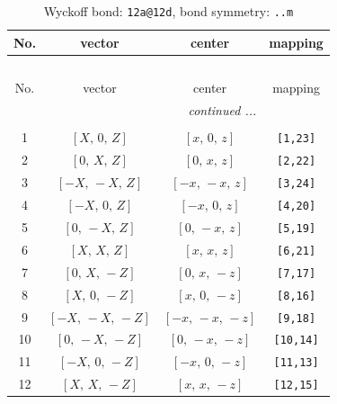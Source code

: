 \documentclass[fleqn,8pt]{jsarticle}
\begin{document}
\begin{longtable}{cccc}
\caption{Wyckoff bond: {\tt 12a@12d}, bond symmetry: {\tt ..m}}
 \\
 \hline \hline
No. & vector & center & mapping \\ \hline \endfirsthead

\multicolumn{3}{l}{\tablename\ \thetable{}} \\
 \hline \hline
No. & vector & center & mapping \\ \hline \endhead

 \hline \hline
\multicolumn{3}{r}{\footnotesize\it continued ...} \\ \endfoot

 \hline \hline
\multicolumn{3}{r}{} \\ \endlastfoot

1 & $\left[ X,\, 0,\, Z \right]$ & $\left[ x,\, 0,\, z \right]$ & {\tt [1,23]} \\ \hline
2 & $\left[ 0,\, X,\, Z \right]$ & $\left[ 0,\, x,\, z \right]$ & {\tt [2,22]} \\ \hline
3 & $\left[ - X,\, - X,\, Z \right]$ & $\left[ - x,\, - x,\, z \right]$ & {\tt [3,24]} \\ \hline
4 & $\left[ - X,\, 0,\, Z \right]$ & $\left[ - x,\, 0,\, z \right]$ & {\tt [4,20]} \\ \hline
5 & $\left[ 0,\, - X,\, Z \right]$ & $\left[ 0,\, - x,\, z \right]$ & {\tt [5,19]} \\ \hline
6 & $\left[ X,\, X,\, Z \right]$ & $\left[ x,\, x,\, z \right]$ & {\tt [6,21]} \\ \hline
7 & $\left[ 0,\, X,\, - Z \right]$ & $\left[ 0,\, x,\, - z \right]$ & {\tt [7,17]} \\ \hline
8 & $\left[ X,\, 0,\, - Z \right]$ & $\left[ x,\, 0,\, - z \right]$ & {\tt [8,16]} \\ \hline
9 & $\left[ - X,\, - X,\, - Z \right]$ & $\left[ - x,\, - x,\, - z \right]$ & {\tt [9,18]} \\ \hline
10 & $\left[ 0,\, - X,\, - Z \right]$ & $\left[ 0,\, - x,\, - z \right]$ & {\tt [10,14]} \\ \hline
11 & $\left[ - X,\, 0,\, - Z \right]$ & $\left[ - x,\, 0,\, - z \right]$ & {\tt [11,13]} \\ \hline
12 & $\left[ X,\, X,\, - Z \right]$ & $\left[ x,\, x,\, - z \right]$ & {\tt [12,15]} \\
\end{longtable}
\renewcommand{\arraystretch}{1.2}
\end{document}
